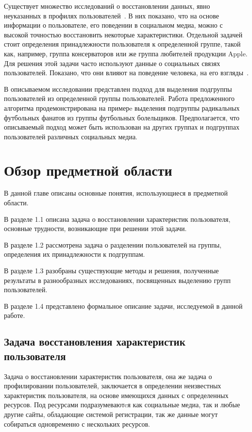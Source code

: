\documentclass[annotation,times,page4]{itmo-student-thesis}
\begin{document}
Существует множество исследований о восстановлении данных, явно неуказанных в профилях пользователей~\cite{blachnio2015facebook, schwartz2013personality, turdakov2013opredelenie, peersman2011predicting}. В них показано, что на основе информации о пользователе, его поведении в социальном медиа, можно с высокой точностью восстановить некоторые характеристики. 
Отдельной задачей стоит определения принадлежности пользователя к определенной группе, такой как, например, группа консерваторов или же группа любителей продукции Apple. Для решения  этой задачи часто используют данные о социальных связях пользователей. Показано, что они влияют на поведение человека, на его взгляды~\cite{trusov2010determining, bond201261}. 

В описываемом исследовании представлен подход для выделения подгруппы пользователей из определенной группы пользователей. Работа предложенного алгоритма продемонстрирована на примерe выделения подгруппы радикальных футбольных фанатов из группы футбольных болельщиков. Предполагается, что описываемый подход может быть использован на других группах и подгруппах пользователей различных социальных медиа.

\chapter{Обзор предметной области}
В данной главе описаны основные понятия, использующиеся в предметной области.

В разделе 1.1 описана задача о восстановлении характеристик пользователя, основные трудности, возникающие при решении этой задачи. 

В разделе 1.2 рассмотрена задача о разделении пользователей на группы, определения их принадлежности к подгруппам.

В разделе 1.3 разобраны существующие методы и решения, полученные результаты в разнообразных исследованиях, посвященных выделению групп пользователей.

В разделе 1.4 представлено формальное описание задачи, исследуемой в данной работе.

\section{Задача восстановления характеристик пользователя}
Задача о восстановлении характеристик пользователя, она же задача о профилировании пользователей, заключается в определении неизвестных характеристик пользователя, на основе имеющихся данных с определенных ресурсов. Под ресурсами подразумеваютcя как социальные медиа, так и любые другие сайты, обладающие системой регистрации, так же данные могут собираться одновременно с нескольких ресурсов.
\end{document}
